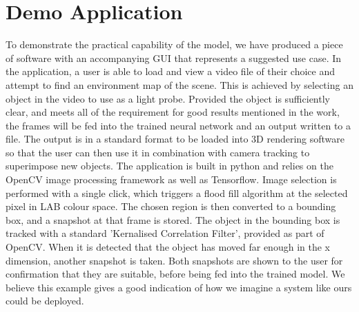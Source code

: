 \documentclass[ %
                    author={Gavin Parker},
                supervisor={Dr. Neill Campbell},
                    degree={MEng},
                     title={Deep Siamese Networks for Illumination Estimation from Stereo Images},
                  subtitle={},
                      type={research},
                      year={2018} ]{dissertation}
\begin{document}

%
%

\backmatter
\printbibliography

\appendix

\chapter{Demo Application}
To demonstrate the practical capability of the model, we have produced a piece of software with an accompanying GUI that represents a suggested use case. In the application, a user is able to load and view a video file of their choice and attempt to find an environment map of the scene. This is achieved by selecting an object in the video to use as a light probe. Provided the object is sufficiently clear, and meets all of the requirement for good results mentioned in the work, the frames will be fed into the trained neural network and an output written to a file. The output is in a standard format to be loaded into 3D rendering software so that the user can then use it in combination with camera tracking to superimpose new objects.
\newline
The application is built in python and relies on the OpenCV image processing framework as well as Tensorflow. Image selection is performed with a single click, which triggers a flood fill algorithm at the selected pixel in LAB colour space. The chosen region is then converted to a bounding box, and a snapshot at that frame is stored. The object in the bounding box is tracked with a standard 'Kernalised Correlation Filter', provided as part of OpenCV. When it is detected that the object has moved far enough in the x dimension, another snapshot is taken. Both snapshots are shown to the user for confirmation that they are suitable, before being fed into the trained model. We believe this example gives a good indication of how we imagine a system like ours could be deployed.
\label{appx:example}
\end{document}
